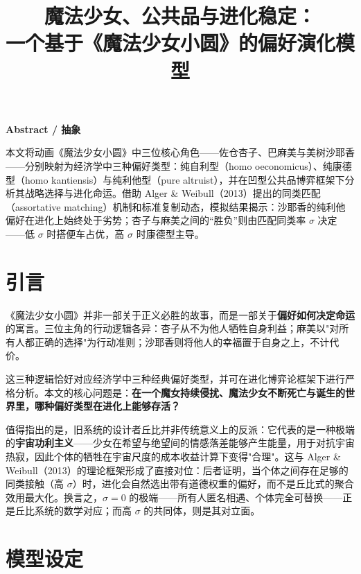 \documentclass[12pt]{article}
\title{魔法少女、公共品与进化稳定：\\
一个基于《魔法少女小圆》的偏好演化模型}
\author{}
\date{}
\begin{document}
\maketitle

\begin{center}
    \textbf{Abstract / 抽象}
\end{center}


\noindent
本文将动画《魔法少女小圆》中三位核心角色——佐仓杏子、巴麻美与美树沙耶香——分别映射为经济学中三种偏好类型：纯自利型（homo oeconomicus）、纯康德型（homo kantiensis）与纯利他型（pure altruist），并在凹型公共品博弈框架下分析其战略选择与进化命运。借助 Alger \& Weibull（2013）提出的同类匹配（assortative matching）机制和标准复制动态，模拟结果揭示：沙耶香的纯利他偏好在进化上始终处于劣势；杏子与麻美之间的“胜负”则由匹配同类率 $\sigma$ 决定——低 $\sigma$ 时搭便车占优，高 $\sigma$ 时康德型主导。


\section{引言}

《魔法少女小圆》并非一部关于正义必胜的故事，而是一部关于\textbf{偏好如何决定命运}的寓言。三位主角的行动逻辑各异：杏子从不为他人牺牲自身利益；麻美以"对所有人都正确的选择"为行动准则；沙耶香则将他人的幸福置于自身之上，不计代价。

这三种逻辑恰好对应经济学中三种经典偏好类型，并可在进化博弈论框架下进行严格分析。本文的核心问题是：\textbf{在一个魔女持续侵扰、魔法少女不断死亡与诞生的世界里，哪种偏好类型在进化上能够存活？}

值得指出的是，旧系统的设计者丘比并非传统意义上的反派：它代表的是一种极端的\textbf{宇宙功利主义}——少女在希望与绝望间的情感落差能够产生能量，用于对抗宇宙热寂，因此个体的牺牲在宇宙尺度的成本收益计算下变得"合理"。这与 Alger \& Weibull（2013）的理论框架形成了直接对位：后者证明，当个体之间存在足够的同类接触（高 $\sigma$）时，进化会自然选出带有道德权重的偏好，而不是丘比式的聚合效用最大化。换言之，$\sigma = 0$ 的极端——所有人匿名相遇、个体完全可替换——正是丘比系统的数学对应；而高 $\sigma$ 的共同体，则是其对立面。

\section{模型设定}
\end{document}
